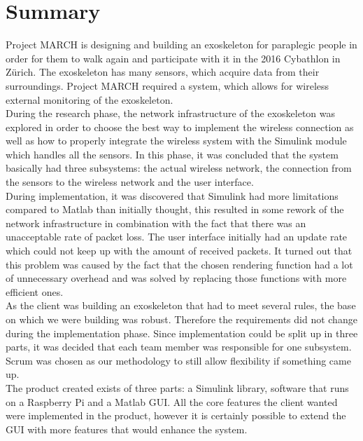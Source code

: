 \chapter*{Summary}
Project MARCH is designing and building an exoskeleton for paraplegic people in order for them to walk again and participate with it in the 2016 Cybathlon in Zürich.  
The exoskeleton has many sensors, which acquire data from their surroundings. Project MARCH required a system, which allows for wireless external monitoring of the exoskeleton. \\
During the research phase, the network infrastructure of the exoskeleton was explored in order to choose the best way to implement the wireless connection as well as how to properly integrate the wireless system with the Simulink module which handles all the sensors. In this phase, it was concluded that the system basically had three subsystems: the actual wireless network, the connection from the sensors to the wireless network and the user interface.\\
During implementation, it was discovered that Simulink had more limitations compared to Matlab than initially thought, this resulted in some rework of the network infrastructure in combination with the fact that there was an unacceptable rate of packet loss. The user interface initially had an update rate which could not keep up with the amount of received packets. It turned out that this problem was caused by the fact that the chosen rendering function had a lot of unnecessary overhead and was solved by replacing those functions with more efficient ones.\\
As the client was building an exoskeleton that had to meet several rules, the base on which we were building was robust. Therefore the requirements did not change during the implementation phase. Since implementation could be split up in three parts, it was decided that each team member was responsible for one subsystem. Scrum was chosen as our methodology to still allow flexibility if something came up.\\
The product created exists of three parts: a Simulink library, software that runs on a Raspberry Pi and a Matlab GUI. 
All the core features the client wanted were implemented in the product, however it is certainly possible to extend the GUI with more features that would enhance the system.


